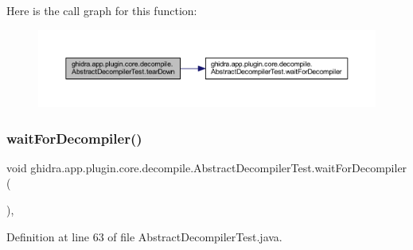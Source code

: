 Here is the call graph for this function\+:
\nopagebreak
\begin{figure}[H]
\begin{center}
\leavevmode
\includegraphics[width=350pt]{classghidra_1_1app_1_1plugin_1_1core_1_1decompile_1_1_abstract_decompiler_test_a153b27b741384bae8302270617332af7_cgraph}
\end{center}
\end{figure}
\mbox{\label{classghidra_1_1app_1_1plugin_1_1core_1_1decompile_1_1_abstract_decompiler_test_ab9c1e094ec0742fb4eede3b741d00987}} 
\subsubsection{\texorpdfstring{waitForDecompiler()}{waitForDecompiler()}}
{\footnotesize\ttfamily void ghidra.\+app.\+plugin.\+core.\+decompile.\+Abstract\+Decompiler\+Test.\+wait\+For\+Decompiler (\begin{DoxyParamCaption}{ }\end{DoxyParamCaption})\hspace{0.3cm}{\ttfamily [inline]}, {\ttfamily [protected]}}



Definition at line 63 of file Abstract\+Decompiler\+Test.\+java.

